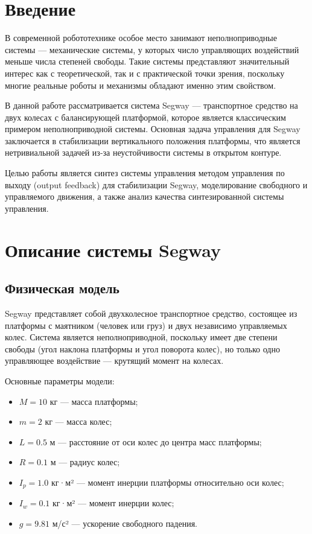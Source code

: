 \section{Введение}

В современной робототехнике особое место занимают неполноприводные системы --- механические системы, у которых число управляющих воздействий меньше числа степеней свободы. Такие системы представляют значительный интерес как с теоретической, так и с практической точки зрения, поскольку многие реальные роботы и механизмы обладают именно этим свойством.

В данной работе рассматривается система Segway --- транспортное средство на двух колесах с балансирующей платформой, которое является классическим примером неполноприводной системы. Основная задача управления для Segway заключается в стабилизации вертикального положения платформы, что является нетривиальной задачей из-за неустойчивости системы в открытом контуре.

Целью работы является синтез системы управления методом управления по выходу (output feedback) для стабилизации Segway, моделирование свободного и управляемого движения, а также анализ качества синтезированной системы управления.

\section{Описание системы Segway}

\subsection{Физическая модель}

Segway представляет собой двухколесное транспортное средство, состоящее из платформы с маятником (человек или груз) и двух независимо управляемых колес. Система является неполноприводной, поскольку имеет две степени свободы (угол наклона платформы и угол поворота колес), но только одно управляющее воздействие --- крутящий момент на колесах.

Основные параметры модели:
\begin{itemize}
    \item $M = 10$ кг --- масса платформы;
    \item $m = 2$ кг --- масса колес;
    \item $L = 0.5$ м --- расстояние от оси колес до центра масс платформы;
    \item $R = 0.1$ м --- радиус колес;
    \item $I_p = 1.0$ кг·м² --- момент инерции платформы относительно оси колес;
    \item $I_w = 0.1$ кг·м² --- момент инерции колес;
    \item $g = 9.81$ м/с² --- ускорение свободного падения.
\end{itemize}

